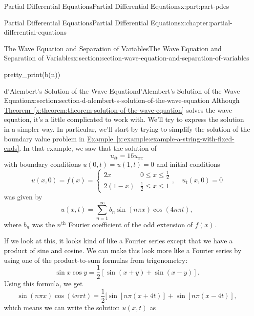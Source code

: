 \documentclass[oneside,10pt,]{book}
\newcommand{\xreffont}{\relax}
\numberwithin{equation}{part}
\renewcommand{\th}{\text{th}}
\newcommand{\amp}{&}
\begin{document}
\begin{partptx}{Partial Differential Equations}{}{Partial Differential Equations}{}{}{x:part:part-pdes}
\begin{chapterptx}{Partial Differential Equations}{}{Partial Differential Equations}{}{}{x:chapter:partial-differential-equations}
\begin{sectionptx}{The Wave Equation and Separation of Variables}{}{The Wave Equation and Separation of Variables}{}{}{x:section:section-wave-equation-and-separation-of-variables}
\begin{sageinput}
pretty_print(b(n))
\end{sageinput}
\end{sectionptx}
%
%
\typeout{************************************************}
\typeout{************************************************}
%
\begin{sectionptx}{d'Alembert's Solution of the Wave Equation}{}{d'Alembert's Solution of the Wave Equation}{}{}{x:section:section-d-alembert-s-solution-of-the-wave-equation}
Although \hyperref[x:theorem:theorem-solution-of-the-wave-equation]{Theorem~{\xreffont\ref{x:theorem:theorem-solution-of-the-wave-equation}}} solves the wave equation, it's a little complicated to work with. We'll try to express the solution in a simpler way. In particular, we'll start by trying to simplify the solution of the boundary value problem in \hyperref[x:example:example-a-string-with-fixed-ends]{Example~{\xreffont\ref{x:example:example-a-string-with-fixed-ends}}}. In that example, we saw that the solution of%
\begin{equation*}
u_{tt} = 16u_{xx}
\end{equation*}
with boundary conditions \(u(0,t) = u(1,t) = 0\) and initial conditions%
\begin{equation*}
u(x,0) = f(x) = \begin{cases} 2x \amp 0\leq x\leq \frac{1}{2} \\ 2(1-x) \amp \frac{1}{2}\leq x\leq 1 \end{cases},\quad u_{t}(x,0) = 0
\end{equation*}
was given by%
\begin{equation*}
u(x,t) = \sum_{n=1}^{\infty}b_{n}\sin(n\pi x)\cos(4n\pi t),
\end{equation*}
where \(b_{n}\) was the \(n^{\th}\) Fourier coefficient of the odd extension of \(f(x)\).%
\par
If we look at this, it looks kind of like a Fourier series except that we have a product of sine and cosine. We can make this look more like a Fourier series by using one of the product-to-sum formulas from trigonometry:%
%
\begin{equation*}
\sin x\cos y = \frac{1}{2}[\sin(x+y)+\sin(x-y)].
\end{equation*}
Using this formula, we get%
\begin{equation*}
\sin(n\pi x)\cos(4n\pi t) = \frac{1}{2}[\sin[n\pi(x+4t)]+\sin[n\pi(x-4t)],
\end{equation*}
which means we can write the solution \(u(x,t)\) as%

\end{sectionptx}
\end{chapterptx}
\end{partptx}
\end{document}
